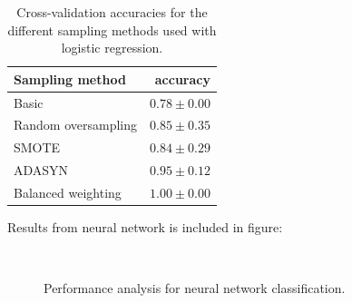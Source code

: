 \begin{table}[h]
    \centering
    \caption{Cross-validation accuracies for the different sampling methods
                used with logistic regression.}
    \label{tab:crossval-logistic}
    \begin{tabular}{l|r}
        Sampling method & accuracy \\
        \hline
        Basic & $0.78 \pm 0.00$ \\
        Random oversampling & $0.85 \pm 0.35$ \\
        SMOTE & $0.84 \pm 0.29$ \\
        ADASYN & $0.95 \pm 0.12$ \\
        Balanced weighting & $1.00 \pm 0.00$\\
    \end{tabular}
\end{table}

Results from neural network is included in figure: 
\begin{figure}[H]
\begin{center}
     \\
\end{center}
\caption[caption]{Performance analysis for neural network classification.}
\label{fig:nn-performance}
\end{figure}

